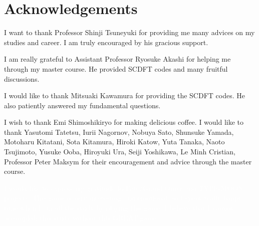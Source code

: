 

\chapter*{Acknowledgements}
I want to thank Professor Shinji Tsuneyuki for providing me many advices on my studies and
career. I am truly encouraged by his gracious support.

I am really grateful to Assistant Professor Ryosuke Akashi for helping me through my 
master course. He provided SCDFT codes and many fruitful discussions.

I would like to thank Mitsuaki Kawamura for providing the SCDFT codes. He also patiently answered
my fundamental questions.

I wish to thank Emi Shimoshikiryo for making delicious coffee.
I would like to thank Yasutomi Tatetsu, Iurii Nagornov, Nobuya Sato, Shunsuke Yamada, 
Motoharu Kitatani, Sota Kitamura, Hiroki Katow, Yuta Tanaka, Naoto Tsujimoto, Yusuke Ooba, 
Hiroyuki Ura, Seiji Yoshikawa, Le Minh Cristian, Professor Peter Maksym for their encouragement
and advice through the master course.

\textcolor{white}{
 I would like to express my gratitude to Fate/Grand Order and TYPE-MOON projects.
 This game is very interesting and emotional, so I spent really happy time when I am off the study by playing this game.
 I believe that I cannot accomplish this study without this GREAT game.
}

\clearpage

